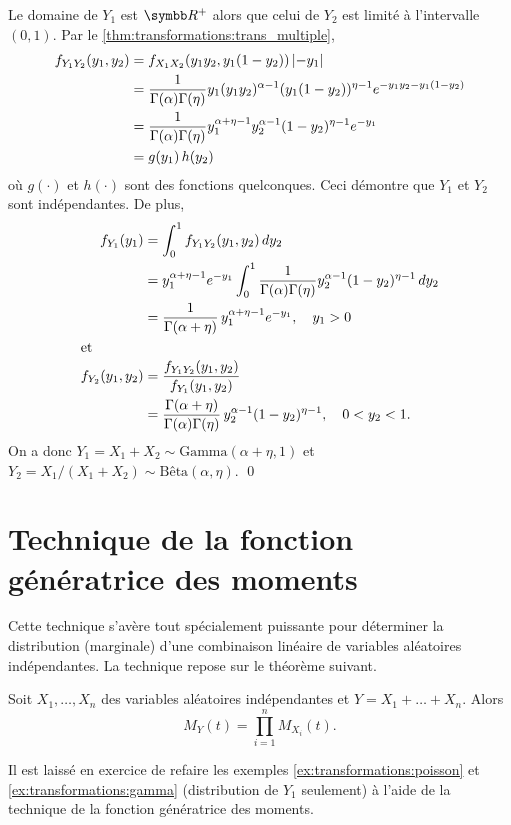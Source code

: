 \begin{exemple}
  Le domaine de $Y_1$ est $\R^+$ alors que celui de $Y_2$ est limité à
  l'intervalle $(0, 1)$. Par le \autoref{thm:transformations:trans_multiple},
  \begin{align*}
    f_{Y_1 Y_2}(y_1, y_2)
    &= f_{X_1 X_2}(y_1 y_2, y_1(1-y_2))\, \lvert -y_1 \rvert \\
    &= \frac{1}{\Gamma(\alpha) \Gamma(\eta)}
    y_1 (y_1 y_2)^{\alpha - 1} (y_1 (1 - y_2))^{\eta - 1} e^{-y_1 y_2
      - y_1(1 - y_2)} \\
    &=  \frac{1}{\Gamma(\alpha) \Gamma(\eta)}
    y_1^{\alpha + \eta - 1} y_2^{\alpha - 1} (1 - y_2)^{\eta - 1}
    e^{-y_1} \\
    &= g(y_1)\, h(y_2)
  \end{align*}
  où $g(\cdot)$ et $h(\cdot)$ sont des fonctions quelconques. Ceci
  démontre que $Y_1$ et $Y_2$ sont indépendantes. De plus,
  \begin{align*}
    f_{Y_1}(y_1)
    &= \int_0^1 f_{Y_1 Y_2}(y_1, y_2)\, dy_2 \\
    &= y_1^{\alpha + \eta - 1} e^{-y_1}
    \int_0^1 \frac{1}{\Gamma(\alpha) \Gamma(\eta)}
    y_2^{\alpha - 1} (1 - y_2)^{\eta - 1}\, dy_2 \\
    &= \frac{1}{\Gamma(\alpha + \eta)}\, y_1^{\alpha + \eta - 1}
    e^{-y_1}, \quad y_1 > 0 \\
    \intertext{et}
    f_{Y_2}(y_1, y_2)
    &= \frac{f_{Y_1 Y_2}(y_1, y_2)}{f_{Y_1}(y_1, y_2)} \\
    &= \frac{\Gamma(\alpha + \eta)}{\Gamma(\alpha) \Gamma(\eta)}\,
    y_2^{\alpha - 1} (1 - y_2)^{\eta - 1}, \quad
    0 < y_2 < 1.
  \end{align*}
  On a donc $Y_1 = X_1 + X_2 \sim \text{Gamma}(\alpha + \eta, 1)$ et
  $Y_2 = X_1/(X_1 + X_2) \sim \text{Bêta}(\alpha, \eta)$. %
  \qed
\end{exemple}


\section{Technique de la fonction génératrice des moments}

Cette technique s'avère tout spécialement puissante pour déterminer la
distribution (marginale) d'une combinaison linéaire de variables
aléatoires indépendantes. La technique repose sur le théorème
suivant.

\begin{thm}
  Soit $X_1, \dots, X_n$ des variables aléatoires indépendantes et $Y
  = X_1 + \dots + X_n$. Alors
  \begin{displaymath}
    M_Y(t) = \prod_{i=1}^n M_{X_i}(t).
  \end{displaymath}
\end{thm}

Il est laissé en exercice de refaire les exemples
\ref{ex:transformations:poisson} et \ref{ex:transformations:gamma}
(distribution de $Y_1$ seulement) à l'aide de la technique de la
fonction génératrice des moments.


